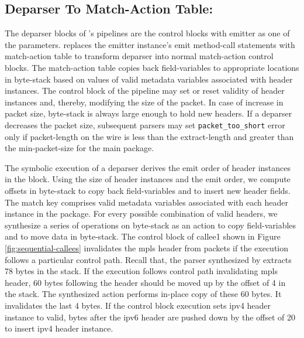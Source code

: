 \documentclass[letterpaper,twocolumn,10pt]{article}
\begin{document}
\subsection{Deparser To Match-Action Table:}
\label{subsection:deparser-to-match-action-table}
The deparser blocks of \uarch's pipelines are the control blocks with emitter as one of the parameters.
\ucomp replaces the emitter instance's emit method-call statements with match-action table to transform deparser into normal match-action control blocks.
The match-action table copies back field-variables to appropriate locations in byte-stack based on values of valid metadata variables associated with header instances. 
The control block of the pipeline may set or reset validity of header instances and, thereby, modifying the size of the packet.
In case of increase in packet size, byte-stack is always large enough to hold new headers.
If a deparser decreases the packet size, subsequent parsers may set \texttt{packet\_too\_short} error only if packet-length on the wire is less than the extract-length and greater than the min-packet-size for the main package.

The symbolic execution of a deparser derives the emit order of header instances in the block.
Using the size of header instances and the emit order, we compute offsets in byte-stack to copy back field-variables and to insert new header fields.
The match key comprises valid metadata variables associated with each header instance in the package.
For every possible combination of valid headers, we synthesize a series of operations on byte-stack as an action to copy field-variables and to move data in byte-stack.
The control block of callee1 shown in Figure \ref{fig:sequential-callees} invalidates the mpls header from packets if the execution follows a particular control path.
Recall that, the parser synthesized by \ucomp extracts 78 bytes in the stack.
If the execution follows control path invalidating mpls header, 60 bytes following the header should be moved up by the offset of 4 in the stack.
The synthesized action performs in-place copy of these 60 bytes. It invalidates the last 4 bytes.
If the control block execution sets ipv4 header instance to valid, bytes after the ipv6 header are pushed down by the offset of 20 to insert ipv4 header instance.

\end{document}
